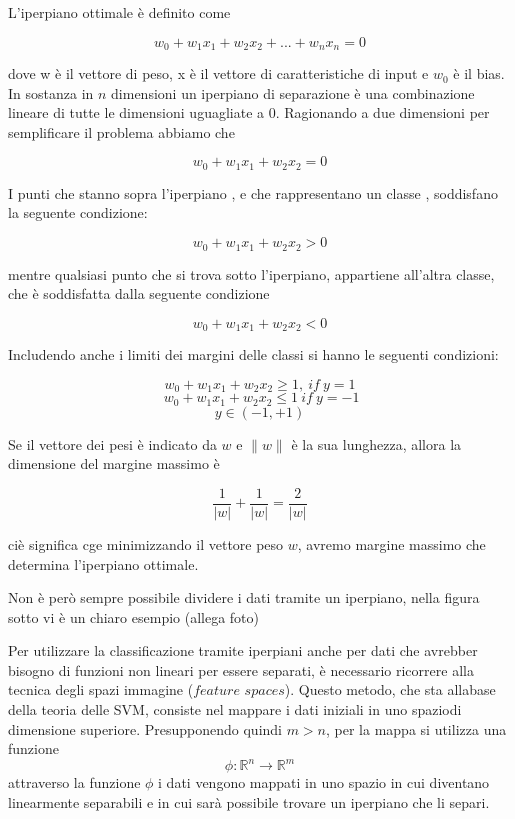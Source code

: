 \documentclass[12pt,italian]{report}
\begin{document}
L'iperpiano ottimale è definito come 
\begin{center}
	\[w_0 + w_1x_1 + w_2x_2 +...+ w_nx_n= 0\]
\end{center}
dove w è il vettore di peso, x è il vettore di caratteristiche di input e $w_0$ è il bias.
In sostanza in $n$ dimensioni un iperpiano di separazione è una combinazione lineare di tutte le dimensioni uguagliate a 0.
Ragionando a due dimensioni per semplificare il problema abbiamo che 
\begin{center}
	\[w_0 + w_1x_1 + w_2x_2 = 0\]
\end{center}
I punti che stanno sopra l'iperpiano , e che rappresentano un classe , soddisfano la seguente condizione:
\begin{center}
	\[w_0 + w_1x_1+w_2x_2 > 0\]
\end{center}
mentre qualsiasi punto che si trova sotto l'iperpiano, appartiene all'altra classe, che è soddisfatta dalla seguente condizione 
\begin{center}
	\[w_0 + w_1x_1+w_2x_2 < 0\]
\end{center}
Includendo anche i limiti dei margini delle classi si hanno le seguenti condizioni:
\begin{center}
	\[w_0 + w_1x_1+w_2x_2 \geq 1,
	\ if
	\ y=1\]
	\[
	\ w_0 + w_1x_1+w_2x_2 \leq 1 
	\ if
	\ y = -1
	\]
	\[ y \in (-1, +1)\]
\end{center}
Se il vettore dei pesi è indicato da $w$ e $\parallel w \parallel$ è la sua lunghezza, allora la dimensione del margine massimo è 
\begin{center}
	\[ \frac{1}{\left | w \right |} + \frac{1}{\left | w \right |} = \frac{2}{\left | w \right |}\]
\end{center}
ciè significa cge minimizzando il vettore peso $w$, avremo margine massimo che determina l'iperpiano ottimale.

Non è però sempre possibile dividere i dati tramite un iperpiano, nella figura sotto vi è un chiaro esempio  (allega foto)

Per utilizzare la classificazione tramite iperpiani anche per dati che avrebber bisogno di funzioni non lineari per essere separati, è necessario ricorrere alla tecnica degli spazi immagine ($feature$ $spaces$). Questo metodo, che sta allabase della teoria delle SVM, consiste nel mappare i dati iniziali in uno spaziodi dimensione superiore.  Presupponendo quindi $m > n$, per la mappa si utilizza una funzione
\begin{equation}
	\phi: \mathbb{R}^{n} \rightarrow \mathbb{R}^{m}
\end{equation}
attraverso la funzione $\phi$ i dati vengono mappati in uno spazio in cui diventano linearmente separabili e in cui sarà possibile trovare un iperpiano che li separi.
\end{document}
